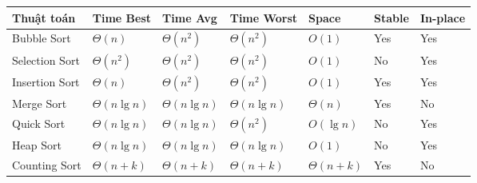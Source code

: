 \documentclass[10pt]{article}
\newcounter{none}
\begin{document}
{\def\LTcaptype{none} %
\begin{longtable}[]{@{}
  >{\raggedright\arraybackslash}p{}
  >{\raggedright\arraybackslash}p{}
  >{\raggedright\arraybackslash}p{}
  >{\raggedright\arraybackslash}p{}
  >{\raggedright\arraybackslash}p{}
  >{\raggedright\arraybackslash}p{}
  >{\raggedright\arraybackslash}p{}@{}}
\toprule\noalign{}
\begin{minipage}[b]{\linewidth}\raggedright
Thuật toán
\end{minipage} & \begin{minipage}[b]{\linewidth}\raggedright
Time Best
\end{minipage} & \begin{minipage}[b]{\linewidth}\raggedright
Time Avg
\end{minipage} & \begin{minipage}[b]{\linewidth}\raggedright
Time Worst
\end{minipage} & \begin{minipage}[b]{\linewidth}\raggedright
Space
\end{minipage} & \begin{minipage}[b]{\linewidth}\raggedright
Stable
\end{minipage} & \begin{minipage}[b]{\linewidth}\raggedright
In-place
\end{minipage} \\
\midrule\noalign{}
\endhead
\bottomrule\noalign{}
\endlastfoot
Bubble Sort & \(\Theta(n)\) & \(\Theta(n^2)\) & \(\Theta(n^2)\) &
\(O(1)\) & Yes & Yes \\
Selection Sort & \(\Theta(n^2)\) & \(\Theta(n^2)\) & \(\Theta(n^2)\) &
\(O(1)\) & No & Yes \\
Insertion Sort & \(\Theta(n)\) & \(\Theta(n^2)\) & \(\Theta(n^2)\) &
\(O(1)\) & Yes & Yes \\
Merge Sort & \(\Theta(n \lg n)\) & \(\Theta(n \lg n)\) &
\(\Theta(n \lg n)\) & \(\Theta(n)\) & Yes & No \\
Quick Sort & \(\Theta(n \lg n)\) & \(\Theta(n \lg n)\) & \(\Theta(n^2)\)
& \(O(\lg n)\) & No & Yes \\
Heap Sort & \(\Theta(n \lg n)\) & \(\Theta(n \lg n)\) & \(\Theta(n \lg n)\)
& \(O(1)\) & No & Yes \\
Counting Sort & \(\Theta(n+k)\) & \(\Theta(n+k)\) & \(\Theta(n+k)\) &
\(\Theta(n+k)\) & Yes & No \\
\end{longtable}
}
\label{tab:sorting-summary}
\end{document}
